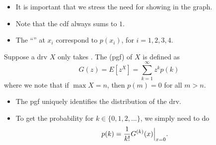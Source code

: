 \documentclass[notoc,notitlepage]{tufte-book}
\begin{document}
\begin{note}
  \begin{itemize}
    \item It is important that we stress the need for showing  in the graph.
    \item Note that the cdf always sums to $1$.
    \item The ``'' at $x_i$ correspond to $p(x_i)$, for $i = 1, 2 ,3, 4$.
  \end{itemize}
\end{note}

\begin{defn}
\label{defn:probability_generating_function}
  Suppose a drv $X$ only takes . The  (pgf) of $X$ is defined as
  \begin{equation*}
    G(z) = E\left[ z^X \right] = \sum_{k=1}^{\infty} z^k p(k)
  \end{equation*}
  where we note that if $\max X = n$, then $p(m) = 0$ for all $m > n$.
\end{defn}

\begin{note}
  \begin{itemize}
    \item The pgf uniquely identifies the distribution of the drv.
    \item To get the probability for $k \in \{0, 1, 2, ...\}$, we simply need to do
      \begin{equation*}
        p(k) = \frac{1}{k!} G^{(k)}(x) \Big|_{x = 0}^{}.
      \end{equation*}
  \end{itemize}
\end{note}
\end{document}
